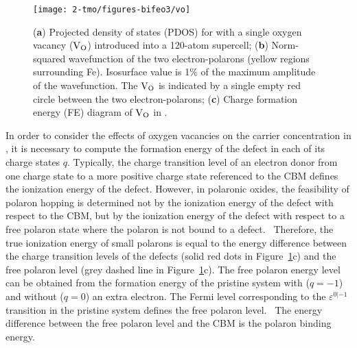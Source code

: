 \begin{figure}
    \centering
    \texttt{[image: 2-tmo/figures-bifeo3/vo]}
    \caption{
    (\textbf{a}) Projected density of states (PDOS) for  with a single oxygen vacancy ($\rm V_O$) introduced into a 120-atom supercell; (\textbf{b}) Norm-squared wavefunction of the two electron-polarons (yellow regions surrounding Fe). Isosurface value is 1\% of the maximum amplitude of the wavefunction. The $\rm V_O$ is indicated by a single empty red circle between the two electron-polarons; (\textbf{c}) Charge formation energy (FE) diagram of $\rm V_O$ in .
    }
    \label{bifeo3:fig:vo}
\end{figure}



In order to consider the effects of oxygen vacancies on the carrier concentration in , it is necessary to compute the formation energy of the defect in each of its charge states $q$.
Typically, the charge transition level of an electron donor from one charge state to a more positive charge state referenced to the CBM defines the ionization energy of the defect. However, in polaronic oxides, the feasibility of polaron hopping is determined not by the ionization energy of the defect with respect to the CBM, but by the ionization energy of the defect with respect to a free polaron state where the polaron is not bound to a defect.~\cite{smart2017effect,seo2018role} Therefore, the true ionization energy of small polarons is equal to the energy difference between the charge transition levels of the defects (solid red dots in Figure~\ref{bifeo3:fig:vo}c) and the free polaron level (grey dashed line in Figure~\ref{bifeo3:fig:vo}c). The free polaron energy level can be obtained from the formation energy of the pristine system with ($q=-1$) and without ($q=0$) an extra electron. The Fermi level corresponding to the $\varepsilon^{0|-1}$ transition in the pristine system defines the free polaron level.~\cite{smart2017effect,seo2018role} The energy difference between the free polaron level and the CBM is the polaron binding energy.

